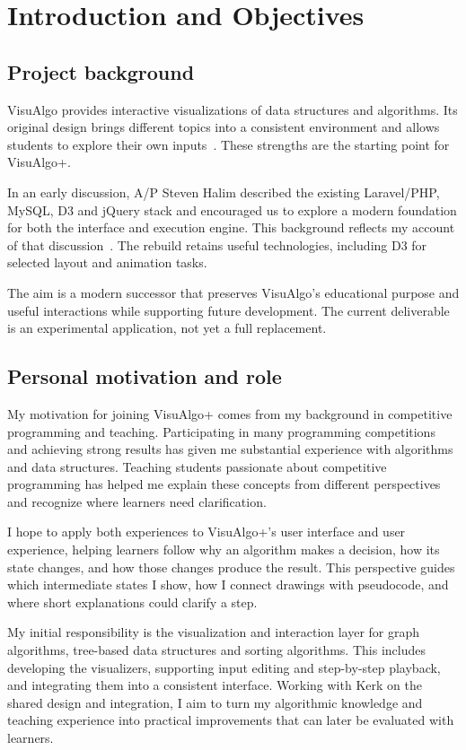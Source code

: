 \documentclass[11pt,a4paper]{article}
\begin{document}
\begingroup
\setlength{\parskip}{4pt}
\linespread{1.0}\selectfont
\section{Introduction and Objectives}
\subsection{Project background}
VisuAlgo provides interactive visualizations of data structures and algorithms. Its original design brings different topics into a consistent environment and allows students to explore their own inputs~\cite{halim2012}. These strengths are the starting point for VisuAlgo+.

In an early discussion, A/P Steven Halim described the existing Laravel/PHP, MySQL, D3 and jQuery stack and encouraged us to explore a modern foundation for both the interface and execution engine. This background reflects my account of that discussion~\cite{evidence}. The rebuild retains useful technologies, including D3 for selected layout and animation tasks.

The aim is a modern successor that preserves VisuAlgo's educational purpose and useful interactions while supporting future development. The current deliverable is an experimental application, not yet a full replacement.

\subsection{Personal motivation and role}
My motivation for joining VisuAlgo+ comes from my background in competitive programming and teaching. Participating in many programming competitions and achieving strong results has given me substantial experience with algorithms and data structures. Teaching students passionate about competitive programming has helped me explain these concepts from different perspectives and recognize where learners need clarification.

I hope to apply both experiences to VisuAlgo+'s user interface and user experience, helping learners follow why an algorithm makes a decision, how its state changes, and how those changes produce the result. This perspective guides which intermediate states I show, how I connect drawings with pseudocode, and where short explanations could clarify a step.

My initial responsibility is the visualization and interaction layer for graph algorithms, tree-based data structures and sorting algorithms. This includes developing the visualizers, supporting input editing and step-by-step playback, and integrating them into a consistent interface. Working with Kerk on the shared design and integration, I aim to turn my algorithmic knowledge and teaching experience into practical improvements that can later be evaluated with learners.
\end{document}
